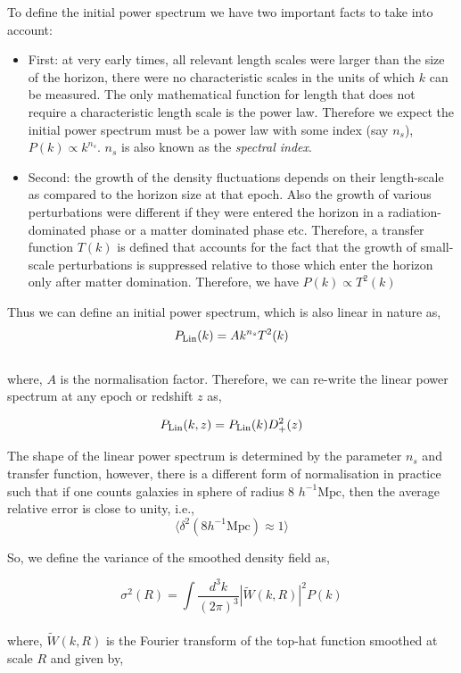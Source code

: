 To define the initial power spectrum we have two important facts to 
take into account:
\begin{itemize}
  \item	First: at very early times, all relevant length scales
	were larger than the size of the horizon, there were no characteristic scales
	in the units of which $k$ can be measured. The only mathematical function
	for length that does not require a characteristic length scale is
	the power law. Therefore we expect the initial power spectrum must be a power
	law with some index (say $n_s$), $P(k)\propto k^{n_s}$. $n_s$ is also known
	as the {\it spectral index}.
  \item Second: the growth of the density fluctuations depends on their length-scale
  	as compared to the horizon size at that epoch. Also the growth of various
  	perturbations were different if they were entered the horizon in a radiation-
  	dominated phase or a matter dominated phase etc. Therefore, a transfer function $T(k)$
  	is defined that accounts for the fact that the growth of small-scale perturbations
  	is suppressed relative to those which enter the horizon only after matter domination.
  	Therefore, we have $P(k) \propto T^2(k)$ 
\end{itemize}

Thus we can define an initial power spectrum, which is also linear in nature as,
\begin{equation}
	P_{\rm Lin}(k) = A k^{n_s} T^2(k)
\end{equation}
\\
where, $A$ is the normalisation factor. Therefore, we can re-write the linear
power spectrum at any epoch or redshift $z$ as,

\begin{equation}
	P_{\rm Lin}(k,z) = P_{\rm Lin}(k) D^2_+(z)
\end{equation}

The shape of the linear power spectrum is determined by the parameter $n_s$ and 
transfer function, however, there is a different form of normalisation in 
practice such that if one counts galaxies in sphere of radius 8 $h^{-1} \mathrm{Mpc}$, then
the average relative error is close to unity, i.e.,
\begin{equation}
	\langle \delta^2(8 h^{-1} \mathrm{Mpc}) \approx 1 \rangle
\end{equation}

So, we define the variance of the smoothed density field as,

\begin{equation}
	\sigma^2(R) = \int \dfrac{d^3k}{(2\pi)^3} |\tilde{W}(k,R)|^2 P(k)
\end{equation}
\\
where, $\tilde{W}(k,R)$ is the Fourier transform of the top-hat function smoothed 
at scale $R$ and given by,


